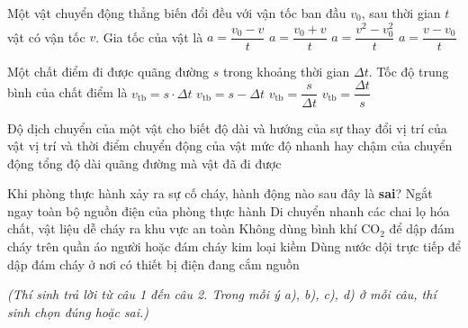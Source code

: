 \begin{ex}
	Một vật chuyển động thẳng biến đổi đều với vận tốc ban đầu $v_0$, sau thời gian $t$ vật có vận tốc $v$. Gia tốc của vật là
	\choice
	{$a = \dfrac{v_0 - v}{t}$}
	{$a = \dfrac{v_0 + v}{t}$}
	{$a = \dfrac{v^2 - v_0^2}{t}$}
	{\True $a = \dfrac{v - v_0}{t}$}
\end{ex}

\begin{ex}
	Một chất điểm đi được quãng đường $s$ trong khoảng thời gian $\Delta t$. Tốc độ trung bình của chất điểm là
	\choice
	{$v_{\text{tb}} = s \cdot \Delta t$}
	{$v_{\text{tb}} = s - \Delta t$}
	{\True $v_{\text{tb}} = \dfrac{s}{\Delta t}$}
	{$v_{\text{tb}} = \dfrac{\Delta t}{s}$}
\end{ex}

\begin{ex}
	Độ dịch chuyển của một vật cho biết
	\choice
	{\True độ dài và hướng của sự thay đổi vị trí của vật}
	{vị trí và thời điểm chuyển động của vật}
	{mức độ nhanh hay chậm của chuyển động}
	{tổng độ dài quãng đường mà vật đã đi được}
\end{ex}

\begin{ex}
	Khi phòng thực hành xảy ra sự cố cháy, hành động nào sau đây là \textbf{sai}?
	\choice
	{Ngắt ngay toàn bộ nguồn điện của phòng thực hành}
	{Di chuyển nhanh các chai lọ hóa chất, vật liệu dễ cháy ra khu vực an toàn}
	{Không dùng bình khí $\text{CO}_2$ để dập đám cháy trên quần áo người hoặc đám cháy kim loại kiềm}
	{\True Dùng nước dội trực tiếp để dập đám cháy ở nơi có thiết bị điện đang cắm nguồn}
\end{ex}

\vspace{0.15cm}
\begin{flushleft}
	{\color{blue!50!green}}
	\textit{\small (Thí sinh trả lời từ câu 1 đến câu 2. Trong mỗi ý a), b), c), d) ở mỗi câu, thí sinh chọn đúng hoặc sai.)}
\end{flushleft}
\setcounter{ex}{0}
\setcounter{bt}{0}

